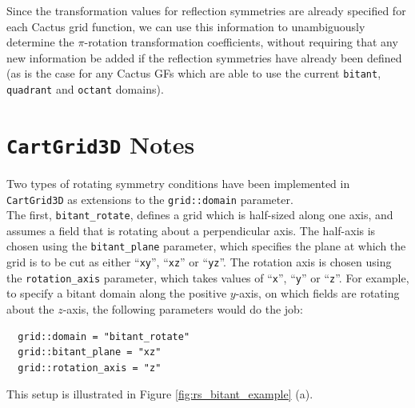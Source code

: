 \documentclass{article}
\begin{document}
Since the transformation values for reflection symmetries are
already specified for each Cactus grid function, we can use this
information to unambiguously determine the $\pi$-rotation
transformation coefficients, without requiring that any new
information be added if the reflection symmetries have already
been defined (as is the case for any Cactus GFs which are able to
use the current \texttt{bitant}, \texttt{quadrant} and \texttt{octant}
domains).

\section{\texttt{CartGrid3D} Notes}
\label{sec:rs_cartgrid3d}

Two types of rotating symmetry conditions have been implemented in
\texttt{CartGrid3D} as extensions to the \texttt{grid::domain}
parameter.\\

The first, \texttt{bitant\_rotate}, defines a grid which is half-sized
along one axis, and assumes a field that is rotating about a
perpendicular axis. The half-axis is chosen using the
\texttt{bitant\_plane} parameter, which specifies the plane at which
the grid is to be cut as either ``\texttt{xy}'', ``\texttt{xz}'' or
``\texttt{yz}''. The rotation axis is chosen using the
\texttt{rotation\_axis} parameter, which takes values of
``\texttt{x}'', ``\texttt{y}'' or ``\texttt{z}''. For example, to
specify a bitant domain along the positive $y$-axis, on which fields
are rotating about the $z$-axis, the following parameters would do the
job:
\begin{verbatim}
  grid::domain = "bitant_rotate"
  grid::bitant_plane = "xz"
  grid::rotation_axis = "z"
\end{verbatim}
This setup is illustrated in Figure \ref{fig:rs_bitant_example} (a).\\
\end{document}
